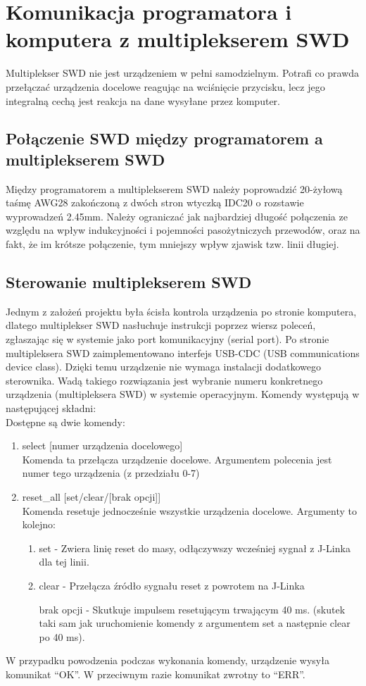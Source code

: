 \chapter{Komunikacja programatora i komputera z multiplekserem SWD}
Multiplekser SWD nie jest urządzeniem w pełni samodzielnym. Potrafi co prawda przełączać urządzenia docelowe reagując na wciśnięcie przycisku, lecz jego integralną cechą jest reakcja na dane wysyłane przez komputer.

\section{Połączenie SWD między programatorem a multiplekserem SWD}
Między programatorem a multiplekserem SWD należy poprowadzić 20-żyłową taśmę AWG28 zakończoną z dwóch stron wtyczką IDC20 o rozstawie wyprowadzeń 2.45mm. Należy ograniczać jak najbardziej długość połączenia ze względu na wpływ indukcyjności i pojemności pasożytniczych przewodów, oraz na fakt, że im krótsze połączenie, tym mniejszy wpływ zjawisk tzw. linii długiej.

\section {Sterowanie multiplekserem SWD}
Jednym z założeń projektu była ścisła kontrola urządzenia po stronie komputera, dlatego multiplekser SWD nasłuchuje instrukcji poprzez wiersz poleceń, zgłaszając się w systemie jako port komunikacyjny (serial port). Po stronie multipleksera SWD zaimplementowano interfejs USB-CDC (USB communications device class). Dzięki temu urządzenie nie wymaga instalacji dodatkowego sterownika. Wadą takiego rozwiązania jest wybranie numeru konkretnego urządzenia (multipleksera SWD) w systemie operacyjnym.
Komendy występują w następującej składni: \\
Dostępne są dwie komendy:
\begin{enumerate}
    \item select [numer urządzenia docelowego] \\
    Komenda ta przełącza urządzenie docelowe.
    Argumentem polecenia jest numer tego urządzenia (z przedziału 0-7) 
    \item reset\_all [set/clear/[brak opcji]] \\
    Komenda resetuje jednocześnie wszystkie urządzenia docelowe.
    Argumenty to kolejno:
    \begin{enumerate}
        \item set - Zwiera linię reset do masy, odłączywszy wcześniej sygnał z J-Linka dla tej linii. 
        \item clear - Przełącza źródło sygnału reset z powrotem na J-Linka
        \item [brak opcji] - Skutkuje impulsem resetującym trwającym 40 ms. (skutek taki sam jak uruchomienie komendy z argumentem set a następnie clear po 40 ms).
    \end{enumerate}
\end{enumerate}

W przypadku powodzenia podczas wykonania komendy, urządzenie wysyła komunikat \enquote{OK}. W przeciwnym razie komunikat zwrotny to \enquote{ERR}.
